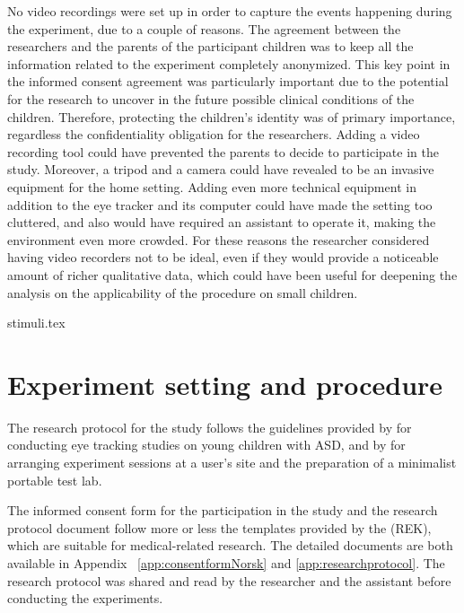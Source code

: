 No video recordings were set up in order to capture the events happening during the experiment, due to a couple of reasons. The agreement between the researchers and the parents of the participant children was to keep all the information related to the experiment completely anonymized. This key point in the informed consent agreement was particularly important due to the potential for the research to uncover in the future possible clinical conditions of the children. Therefore, protecting the children’s identity was of primary importance, regardless the confidentiality obligation for the researchers. Adding a video recording tool could have prevented the parents to decide to participate in the study. Moreover, a tripod and a camera could have revealed to be an invasive equipment for the home setting. Adding even more technical equipment in addition to the eye tracker and its computer could have made the setting too cluttered, and also would have required an assistant to operate it, making the environment even more crowded. For these reasons the researcher considered having video recorders not to be ideal, even if they would provide a noticeable amount of richer qualitative data, which could have been useful for deepening the analysis on the applicability of the procedure on small children.




{stimuli.tex}




\section{Experiment setting and procedure}
\label{sec:expsetting}

The research protocol for the study follows the guidelines provided by \cite{sasson2012children} for conducting eye tracking studies on young children with ASD, and by \cite[pp. 98-101]{rubinchisnell2008hout} for arranging experiment sessions at a user’s site and the preparation of a minimalist portable test lab.

The informed consent form for the participation in the study and the research protocol document follow more or less the templates provided by the \cite{rek2017templates}(REK), which are suitable for medical-related research. The detailed documents are both available in Appendix ~\ref{app:consentformNorsk} and \ref{app:researchprotocol}. The research protocol was shared and read by the researcher and the assistant before conducting the experiments.

